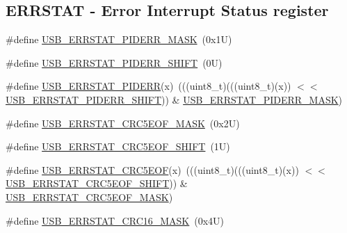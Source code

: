 \subsection*{E\+R\+R\+S\+T\+AT -\/ Error Interrupt Status register}
\begin{DoxyCompactItemize}
\item 
\#define \mbox{\hyperlink{group___u_s_b___register___masks_gadf359cce923ca198235ecef76b5cc789}{U\+S\+B\+\_\+\+E\+R\+R\+S\+T\+A\+T\+\_\+\+P\+I\+D\+E\+R\+R\+\_\+\+M\+A\+SK}}~(0x1\+U)
\item 
\#define \mbox{\hyperlink{group___u_s_b___register___masks_gaf10f584ce9bbe8d7c0d0b8a6a4f61352}{U\+S\+B\+\_\+\+E\+R\+R\+S\+T\+A\+T\+\_\+\+P\+I\+D\+E\+R\+R\+\_\+\+S\+H\+I\+FT}}~(0\+U)
\item 
\#define \mbox{\hyperlink{group___u_s_b___register___masks_gaaea4b668baa49e256f30660df4cfdd38}{U\+S\+B\+\_\+\+E\+R\+R\+S\+T\+A\+T\+\_\+\+P\+I\+D\+E\+RR}}(x)~(((uint8\+\_\+t)(((uint8\+\_\+t)(x)) $<$$<$ \mbox{\hyperlink{group___u_s_b___register___masks_gaf10f584ce9bbe8d7c0d0b8a6a4f61352}{U\+S\+B\+\_\+\+E\+R\+R\+S\+T\+A\+T\+\_\+\+P\+I\+D\+E\+R\+R\+\_\+\+S\+H\+I\+FT}})) \& \mbox{\hyperlink{group___u_s_b___register___masks_gadf359cce923ca198235ecef76b5cc789}{U\+S\+B\+\_\+\+E\+R\+R\+S\+T\+A\+T\+\_\+\+P\+I\+D\+E\+R\+R\+\_\+\+M\+A\+SK}})
\item 
\#define \mbox{\hyperlink{group___u_s_b___register___masks_ga400a9d616bd8457e1003d62d62660b5a}{U\+S\+B\+\_\+\+E\+R\+R\+S\+T\+A\+T\+\_\+\+C\+R\+C5\+E\+O\+F\+\_\+\+M\+A\+SK}}~(0x2\+U)
\item 
\#define \mbox{\hyperlink{group___u_s_b___register___masks_ga42e986ec54195657a22043422895c708}{U\+S\+B\+\_\+\+E\+R\+R\+S\+T\+A\+T\+\_\+\+C\+R\+C5\+E\+O\+F\+\_\+\+S\+H\+I\+FT}}~(1\+U)
\item 
\#define \mbox{\hyperlink{group___u_s_b___register___masks_ga78ce9d0a03d22435b46c94d12c98be2f}{U\+S\+B\+\_\+\+E\+R\+R\+S\+T\+A\+T\+\_\+\+C\+R\+C5\+E\+OF}}(x)~(((uint8\+\_\+t)(((uint8\+\_\+t)(x)) $<$$<$ \mbox{\hyperlink{group___u_s_b___register___masks_ga42e986ec54195657a22043422895c708}{U\+S\+B\+\_\+\+E\+R\+R\+S\+T\+A\+T\+\_\+\+C\+R\+C5\+E\+O\+F\+\_\+\+S\+H\+I\+FT}})) \& \mbox{\hyperlink{group___u_s_b___register___masks_ga400a9d616bd8457e1003d62d62660b5a}{U\+S\+B\+\_\+\+E\+R\+R\+S\+T\+A\+T\+\_\+\+C\+R\+C5\+E\+O\+F\+\_\+\+M\+A\+SK}})
\item 
\#define \mbox{\hyperlink{group___u_s_b___register___masks_gac9682448ca13abab007c9438e811610c}{U\+S\+B\+\_\+\+E\+R\+R\+S\+T\+A\+T\+\_\+\+C\+R\+C16\+\_\+\+M\+A\+SK}}~(0x4\+U)

\end{DoxyCompactItemize}
